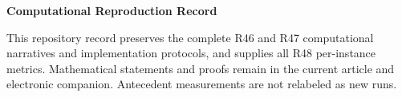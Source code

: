 \documentclass[11pt,letterpaper]{article}
\theoremstyle{definition}\newtheorem{assumption}[theorem]{Assumption}
\begin{document}
\begin{center}{\Large\bfseries Computational Reproduction Record}\end{center}
This repository record preserves the complete R46 and R47 computational narratives and implementation protocols, and supplies all R48 per-instance metrics. Mathematical statements and proofs remain in the current article and electronic companion. Antecedent measurements are not relabeled as new runs.



\clearpage
\clearpage
\end{document}
